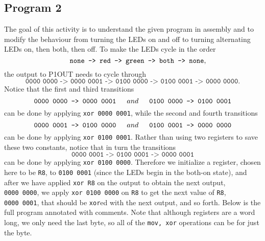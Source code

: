 \documentclass[11pt]{article}
\begin{document}
	\subsection{Program 2}
		The goal of this activity is to understand the given program in assembly and to modify the behaviour from turning the LEDs on and off to turning alternating LEDs on, then both, then off. To make the LEDs cycle in the order
		$$\indent \texttt{none -> red -> green -> both -> none},$$
		the output to P1OUT needs to cycle through
		$$\texttt{0000 0000 -> 0000 0001 -> 0100 0000 -> 0100 0001 -> 0000 0000}.$$ 
		\newpage
		Notice that the first and third transitions
		$$\texttt{0000 0000 -> 0000 0001} \indent and \indent \texttt{0100 0000 -> 0100 0001}$$
		can be done by applying \texttt{xor 0000 0001}, while the second and fourth transitions
		$$\texttt{0000 0001 -> 0100 0000} \indent and \indent \texttt{0100 0001 -> 0000 0000}$$
		can be done by applying \texttt{xor 0100 0001}. Rather than using two registers to save these two constants, notice that in turn the transitions
		$$\texttt{0000 0001 -> 0100 0001 -> 0000 0001}$$
		can be done by applying \texttt{xor 0100 0000}. Therefore we initialize a register, chosen here to be \texttt{R8}, to \texttt{0100~0001} (since the LEDs begin in the both-on state), and after we have applied \texttt{xor R8} on the output to obtain the next output, \texttt{0000~0000}, we apply \texttt{xor 0100~0000} on \texttt{R8} to get the next value of \texttt{R8}, \texttt{0000~0001}, that should be \texttt{xor}ed with the next output, and so forth. Below is the full program annotated with comments. Note that although registers are a word long, we only need the last byte, so all of the \texttt{mov, xor} operations can be for just the byte.
		
\end{document}

